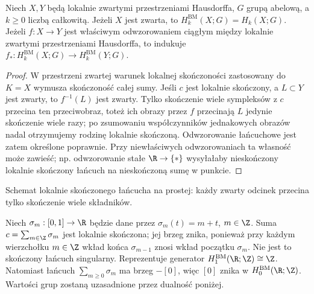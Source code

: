 \begin{stwierdzenie}
\label{prop:BM-proper-v11}
Niech $X,Y$ będą lokalnie zwartymi przestrzeniami Hausdorffa,
$G$ grupą abelową, a $k\ge0$ liczbą całkowitą.
Jeżeli $X$ jest zwarta, to $H_k^{\mathrm{BM}}(X;G)=H_k(X;G)$.
Jeżeli $f:X\to Y$ jest właściwym odwzorowaniem ciągłym
między lokalnie zwartymi przestrzeniami Hausdorffa,
to indukuje $f_*:H_k^{\mathrm{BM}}(X;G)\to H_k^{\mathrm{BM}}(Y;G)$.
\end{stwierdzenie}
\begin{proof}
W przestrzeni zwartej warunek lokalnej skończoności
zastosowany do $K=X$ wymusza skończoność całej sumy.
Jeśli $c$ jest lokalnie skończony, a $L\subset Y$ jest zwarty,
to $f^{-1}(L)$ jest zwarty. Tylko skończenie wiele
sympleksów z $c$ przecina ten przeciwobraz, toteż
ich obrazy przez $f$ przecinają $L$ jedynie skończenie
wiele razy; po zsumowaniu współczynników jednakowych
obrazów nadal otrzymujemy rodzinę lokalnie skończoną.
Odwzorowanie łańcuchowe jest zatem określone
poprawnie. Przy niewłaściwych odwzorowaniach ta własność
może zawieść; np. odwzorowanie stałe $\R\to\{*\}$
wysyłałaby nieskończony lokalnie skończony łańcuch
na nieskończoną sumę w punkcie.
\end{proof}

\begin{center}
\par\smallskip\small Schemat lokalnie skończonego łańcucha na prostej:
każdy zwarty odcinek przecina tylko skończenie wiele składników.
\end{center}

\begin{przyklad}
\label{ex:BM-line-v11}
Niech $\sigma_m:[0,1]\to\R$ będzie dane przez
$\sigma_m(t)=m+t$, $m\in\Z$. Suma
$c=\sum_{m\in\Z}\sigma_m$ jest lokalnie skończona;
jej brzeg znika, ponieważ przy każdym wierzchołku
$m\in\Z$ wkład końca $\sigma_{m-1}$ znosi wkład
początku $\sigma_m$. Nie jest to skończony łańcuch
singularny. Reprezentuje generator
$H_1^{\mathrm{BM}}(\R;\Z)\cong\Z$.
Natomiast łańcuch $\sum_{m\ge0}\sigma_m$ ma brzeg
$-[0]$, więc $[0]$ znika w $H_0^{\mathrm{BM}}(\R;\Z)$.
Wartości grup zostaną uzasadnione przez dualność poniżej.
\end{przyklad}

